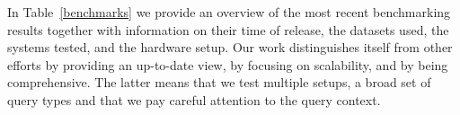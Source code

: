 In Table~\ref{benchmarks} we provide an overview of the most recent benchmarking results together with information on their time of release, the datasets used,
the systems tested, and the hardware setup. Our work distinguishes itself from other efforts by providing an up-to-date view, by focusing on scalability, and by being comprehensive. The latter means that we test multiple setups, a broad set of query types and that we pay careful attention to the query context.

%
%
%
%
